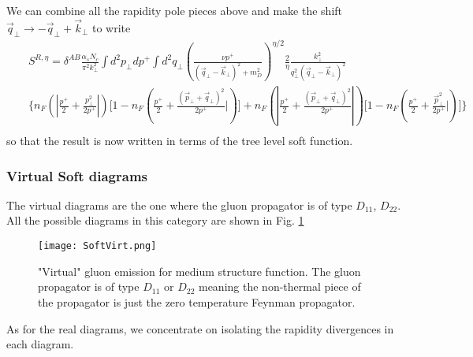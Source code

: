 \documentclass[letter,11pt]{article}
\newcommand{\nn}{\nonumber}
\newcommand{\bea}{\begin{eqnarray}}
\newcommand{\eea}{\end{eqnarray}}
\def\nn{\nonumber}
\begin{document}
We can combine all the rapidity pole pieces above and make the shift $\vec{q}_{\perp} \rightarrow -\vec{q}_{\perp}+\vec{k}_{\perp}$ to write
\small
\bea
\label{RapidSoftR}
&&S^{R,\eta} = \delta^{AB}\frac{\alpha_sN_c}{\pi^2k_{\perp}^2}\int d^2p_{\perp}dp^+ \int d^2q_{\perp} \left(\frac{\nu p^+}{(\vec{q}_{\perp}-\vec{k}_{\perp})^2+m_D^2}\right)^{\eta/2}\frac{2}{\eta}\frac{k_{\perp}^2}{q_{\perp}^2 (\vec{q}_{\perp}-\vec{k}_{\perp})^2}\nn\\
&&\Bigg\{ n_F(|\frac{p^+}{2}+\frac{p_{\perp}^2}{2p^+}|)\Big[1- n_F\left( \frac{p^+}{2}+\frac{(\vec{p}_{\perp}+\vec{q}_{\perp})^2}{2p^+}|\right)\Big]+ n_F(|\frac{p^+}{2}+\frac{(\vec{p}_{\perp}+\vec{q}_{\perp})^2}{2p^+}|)\Big[1- n_F\left( \frac{p^+}{2}+\frac{\vec{p}_{\perp}^2}{2p^+}|\right)\Big] \Bigg\}\nn\\
\eea
\normalsize 
so that the result is now written in terms of the tree level soft function.

\subsubsection{Virtual Soft diagrams}

The virtual diagrams are the one where the gluon propagator is of type $D_{11}$, $D_{22}$. All the possible diagrams in this category are shown in Fig. \ref{SoftV}

\begin{figure}
  \texttt{[image: SoftVirt.png]}
  \caption{"Virtual" gluon emission for medium structure function. The gluon propagator is of type $D_{11}$ or $D_{22}$ meaning the non-thermal piece of the propagator is just the zero temperature Feynman propagator.}
  \label{SoftV}
\end{figure}
As for the real diagrams, we concentrate on isolating the rapidity divergences in each diagram.
\end{document}
